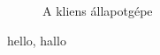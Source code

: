 \begin{figure}[htbp]
\center
{}
\caption{A kliens állapotgépe}
\label{fig:client_statemachine_full}
\end{figure}

hello, hallo 

